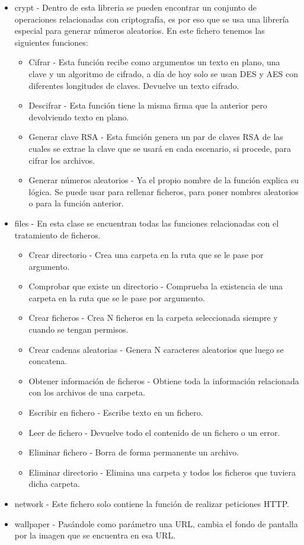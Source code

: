 \documentclass[a4paper,12pt]{article}
\begin{document}
\begin{itemize}
	\item crypt - Dentro de esta libreria se pueden encontrar un conjunto de operaciones relacionadas con criptografía, es por eso que se usa una librería especial para generar números aleatorios. En este fichero tenemos las siguientes funciones:
	\begin{itemize}
		\item Cifrar - Esta función recibe como argumentos un texto en plano, una clave y un algoritmo de cifrado, a día de hoy solo se usan DES y AES con diferentes longitudes de claves. Devuelve un texto cifrado.
		\item Descifrar - Esta función tiene la misma firma que la anterior pero devolviendo texto en plano.
		\item Generar clave RSA - Esta función genera un par de claves RSA\cite{rsa} de las cuales se extrae la clave que se usará en cada escenario, si procede, para cifrar los archivos.
		\item Generar números aleatorios - Ya el propio nombre de la función explica su lógica. Se puede usar para rellenar ficheros, para poner nombres aleatorios o para la función anterior.
	\end{itemize}
	\item files - En esta clase se encuentran todas las funciones relacionadas con el tratamiento de ficheros.
	\begin{itemize}
		\item Crear directorio - Crea una carpeta en la ruta que se le pase por argumento.
		\item Comprobar que existe un directorio - Comprueba la existencia de una carpeta en la ruta que se le pase por argumento.
		\item Crear ficheros - Crea N ficheros en la carpeta seleccionada siempre y cuando se tengan permisos.
		\item Crear cadenas aleatorias - Genera N caracteres aleatorios que luego se concatena.
		\item Obtener información de ficheros - Obtiene toda la información relacionada con los archivos de una carpeta.
		\item Escribir en fichero - Escribe texto en un fichero.
		\item Leer de fichero - Devuelve todo el contenido de un fichero o un error.
		\item Eliminar fichero - Borra de forma permanente un archivo.
		\item Eliminar directorio - Elimina una carpeta y todos los ficheros que tuviera dicha carpeta.
	\end{itemize}
	\item network - Este fichero solo contiene la función de realizar peticiones HTTP. 
	\item wallpaper - Pasándole como parámetro una URL, cambia el fondo de pantalla por la imagen que se encuentra en esa URL.
\end{itemize} 
\end{document}
